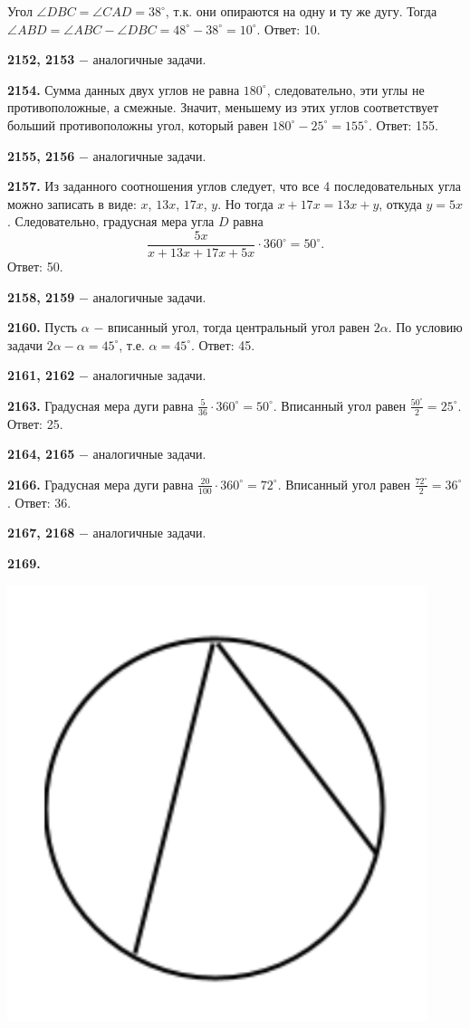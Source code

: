 Угол $\angle DBC = \angle CAD = 38^\circ$, т.к. они опираются на одну и ту же дугу. Тогда $\angle ABD = \angle ABC - \angle DBC = 48^\circ - 38^\circ=10^\circ$. \newline \null \hspace*{\fill} Ответ: 10.

\textbf{2152, 2153} $-$ аналогичные задачи.

\textbf{2154.} Сумма данных двух углов не равна $180^\circ$, следовательно, эти углы не противоположные, а смежные. Значит, меньшему из этих углов соответствует больший противоположны угол, который равен $180^\circ-25^\circ=155^\circ$.\newline \null \hspace*{\fill} Ответ: 155.

\textbf{2155, 2156} $-$ аналогичные задачи.

\textbf{2157.} Из заданного соотношения углов следует, что все 4 последовательных угла  можно записать в виде: $x$, $13x$, $17x$, $y$. Но тогда $x+17x=13x+y$, откуда $y=5x$. Следовательно, градусная мера угла $D$ равна
\[
\frac{5x}{x+13x+17x+5x}\cdot360^\circ=50^\circ.
\]\null \hspace*{\fill} Ответ: 50.

\textbf{2158, 2159} $-$ аналогичные задачи.

\textbf{2160.} Пусть $\alpha$ $-$ вписанный угол, тогда центральный угол равен $2\alpha$. По условию задачи $2\alpha - \alpha = 45^\circ$, т.е. $\alpha = 45^\circ$. \newline \null \hspace*{\fill} Ответ: 45.

\textbf{2161, 2162} $-$ аналогичные задачи.

\textbf{2163.} Градусная мера дуги равна $\frac{5}{36}\cdot360^\circ=50^\circ$. Вписанный угол равен $\frac{50^\circ}{2} = 25^\circ$. \newline \null \hspace*{\fill} Ответ: 25.

\textbf{2164, 2165} $-$ аналогичные задачи.

\textbf{2166.} Градусная мера дуги равна $\frac{20}{100}\cdot360^\circ=72^\circ$. Вписанный угол равен $\frac{72^\circ}{2} = 36^\circ$. \newline \null \hspace*{\fill} Ответ: 36.

\textbf{2167, 2168} $-$ аналогичные задачи.

\textbf{2169.}

{\centering \includegraphics[width=0.35\linewidth]{Geometry/Content/45.png}
	
}

